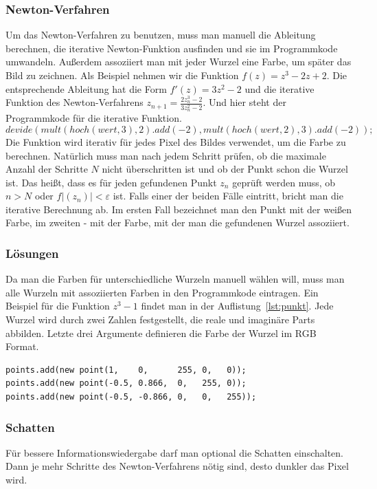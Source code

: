 \documentclass[a4paper,12pt]{llncs}
\numberwithin{equation}{section}
\begin{document}
\subsubsection{Newton-Verfahren}
Um das Newton-Verfahren zu benutzen, muss man manuell die Ableitung berechnen, die iterative Newton-Funktion ausfinden und sie im Programmkode umwandeln.
Außerdem assoziiert man mit jeder Wurzel eine Farbe, um später das Bild zu zeichnen.
Als Beispiel nehmen wir die Funktion $f(z) = z^3 - 2z + 2$.
Die entsprechende Ableitung hat die Form $f'(z) = 3z^2 - 2$ und die iterative Funktion des Newton-Verfahrens $z_{n+1} = \frac{2z_n^3 - 2}{3z_n^2 - 2}$.
Und hier steht der Programmkode für die iterative Funktion.
\[
	devide(mult(hoch(wert,3),2).add(-2), mult(hoch(wert,2),3).add(-2));
\]
Die Funktion wird iterativ für jedes Pixel des Bildes verwendet, um die Farbe zu berechnen.
Natürlich muss man nach jedem Schritt prüfen, ob die maximale Anzahl der Schritte $N$ nicht überschritten ist und ob der Punkt schon die Wurzel ist. 
Das heißt, dass es für jeden gefundenen Punkt $z_n$ geprüft werden muss, ob $n > N$ oder $f|(z_n)| < \varepsilon$ ist.
Falls einer der beiden Fälle eintritt, bricht man die iterative Berechnung ab.
Im ersten Fall bezeichnet man den Punkt mit der weißen Farbe, im zweiten - mit der Farbe, mit der man die gefundenen Wurzel assoziiert. 

\subsubsection{Lösungen} 
Da man die Farben für unterschiedliche Wurzeln manuell wählen will, muss man alle Wurzeln mit assoziierten Farben in den Programmkode eintragen. 
Ein Beispiel für die Funktion $z^3 - 1$ findet man in der Auflistung~\ref{lst:punkt}. 
Jede Wurzel wird durch zwei Zahlen festgestellt, die reale und imaginäre Parts abbilden.
Letzte drei Argumente definieren die Farbe der Wurzel im RGB Format.
\begin{lstlisting}[caption=Wurzeln mit Farben für $z^3 - 1$, label=lst:punkt,captionpos=b]
points.add(new point(1,	   0,	   255, 0,   0));
points.add(new point(-0.5, 0.866,  0,   255, 0));
points.add(new point(-0.5, -0.866, 0,   0,   255));
\end{lstlisting}

\subsubsection{Schatten}
Für bessere Informationswiedergabe darf man optional die Schatten einschalten.
Dann je mehr Schritte des Newton-Verfahrens nötig sind, desto dunkler das Pixel wird.  
\end{document}
